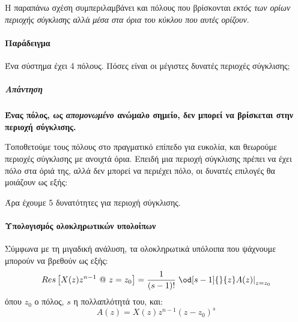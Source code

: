 \documentclass[11pt,a4paper,notitlepage,fleqn]{article}
\begin{document}
Η παραπάνω σχέση συμπεριλαμβάνει και πόλους που βρίσκονται \emph{εκτός των ορίων περιοχής σύγκλισης} αλλά
\emph{μέσα στα όρια του κύκλου που αυτές ορίζουν}.

\paragraph{Παράδειγμα}
Ένα σύστημα έχει 4 πόλους. Πόσες είναι οι μέγιστες δυνατές περιοχές σύγκλισης;
\subparagraph{Απάντηση}
\textbf{Ένας πόλος, ως \emph{απομονωμένο} ανώμαλο σημείο, δεν μπορεί να βρίσκεται στην περιοχή σύγκλισης.}

Τοποθετούμε τους πόλους στο πραγματικό επίπεδο για ευκολία, και θεωρούμε περιοχές σύγκλισης με ανοιχτά
όρια. Επειδή μια περιοχή σύγκλισης πρέπει να έχει πόλο στα όριά της, αλλά δεν μπορεί να περιέχει πόλο,
οι δυνατές επιλογές θα μοιάζουν ως εξής:


Άρα έχουμε 5 δυνατότητες για περιοχή σύγκλισης.

\paragraph{Υπολογισμός ολοκληρωτικών υπολοίπων}
Σύμφωνα με τη μιγαδική ανάλυση, τα ολοκληρωτικά υπόλοιπα που ψάχνουμε μπορούν να βρεθούν ως εξής:
\[
\mathop{Res}\left[
X(z)z^{n-1} \ @\ z=z_0
\right] = \frac{1}{(s-1)!} \left.\od[s-1]{}{z} A(z)\right|_{z=z_0}
\]
όπου \( z_0 \) ο πόλος, \( s \) η πολλαπλότητά του, και:
\[
A(z) = X(z)z^{n-1}(z-z_0)^s
\]
\end{document}

